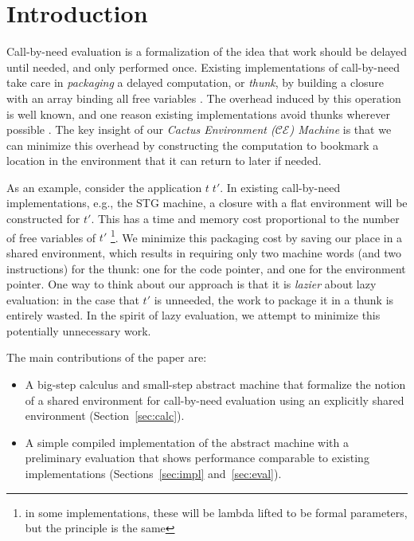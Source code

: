 \section{Introduction}

Call-by-need evaluation is a formalization of the idea that work
should be delayed until needed, and only performed once.  Existing
implementations of call-by-need take care in \emph{packaging} a delayed
computation, or \emph{thunk}, by building a closure with an array binding all
free variables \cite{jonesstg,boquist1997grin}. The overhead induced by this
operation is well known, and one reason existing implementations avoid thunks
wherever possible \cite{johnsson1984efficient}. The key insight of our
\emph{Cactus Environment ($\mathcal{CE}$) Machine} is that we can minimize this
overhead by constructing the computation to bookmark a location in the
environment that it can return to later if needed.

As an example, consider the application $t \; t'$. In existing call-by-need
implementations, e.g., the STG machine, a closure with a flat environment will be
constructed for $t'$.  This has a time and memory cost proportional to the
number of free variables of $t'$ \footnote{in some implementations, these will
be lambda lifted to be formal parameters, but the principle is the same}.  We
minimize this packaging cost by saving our place in a shared environment, which
results in requiring only two machine words (and two instructions) for the
thunk: one for the code pointer, and one for the environment pointer. One way to
think about our approach is that it is \emph{lazier} about lazy evaluation: in
the case that $t'$ is unneeded, the work to package it in a thunk is entirely
wasted. In the spirit of lazy evaluation, we attempt to minimize this
potentially unnecessary work.  

The main contributions of the paper are:
\begin{itemize}
\item A big-step calculus and small-step abstract machine that formalize the
notion of a shared environment for call-by-need evaluation using an explicitly
shared environment (Section~\ref{sec:calc}).
\item A simple compiled implementation of the abstract machine with a 
preliminary evaluation that shows performance comparable to existing
implementations (Sections~\ref{sec:impl} and~\ref{sec:eval}).
\end{itemize}

